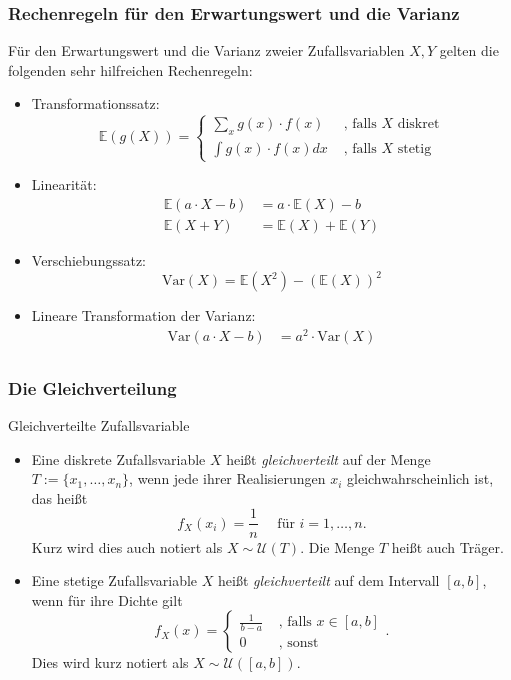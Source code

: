 \begin{frame}
\frametitle{Rechenregeln für den Erwartungswert und die Varianz}
Für den Erwartungswert und die Varianz zweier Zufallsvariablen $X,Y$ gelten die folgenden sehr hilfreichen Rechenregeln:
\begin{itemize}[<+->]
\item Transformationssatz:\[
\mathbb{E}(g(X)) = \begin{cases} \sum_x g(x)\cdot f(x) & \text{ , falls $X$ diskret}\\ \int g(x)\cdot f(x) dx & \text{ , falls $X$ stetig} \end{cases}
\]
\item Linearität:
\begin{align*}
\mathbb{E}(a\cdot X -b) &= a\cdot\mathbb{E}(X) -b \\
\mathbb{E}(X+Y) &= \mathbb{E}(X) + \mathbb{E}(Y)
\end{align*}
\item Verschiebungssatz: 
\[
\text{Var}(X) = \mathbb{E}(X^2) - \left(\mathbb{E}(X)\right)^2
\]
\item Lineare Transformation der Varianz:
\begin{align*} 
\text{Var}(a\cdot X -b) &= a^2\cdot\text{Var}(X) \\
\end{align*}
\end{itemize}
\end{frame}
\begin{frame}
\frametitle{Die Gleichverteilung}
\begin{block}{Gleichverteilte Zufallsvariable}
\begin{itemize}[<+->]
\item Eine diskrete Zufallsvariable $X$ heißt \textit{gleichverteilt} auf der Menge $T:=\lbrace x_1,\ldots,x_n\rbrace$, wenn jede ihrer Realisierungen $x_i$ gleichwahrscheinlich ist, das heißt
\[ f_X(x_i) = \frac{1}{n} \quad\text{ für } i=1,\ldots,n.\] Kurz wird dies auch notiert als  $X\sim \mathcal{U}(T) $. Die Menge $T$ heißt auch Träger.
\item Eine stetige Zufallsvariable $X$ heißt \textit{gleichverteilt} auf dem Intervall $[a,b]$, wenn für ihre Dichte gilt
\[ f_X(x) = \begin{cases} \frac{1}{b-a} & \text{ , falls } x\in [a,b] \\ 0 & \text{ , sonst } \end{cases}. \] Dies wird kurz notiert als $X\sim \mathcal{U}([a,b])$.
\end{itemize}
\end{block}
\end{frame}
